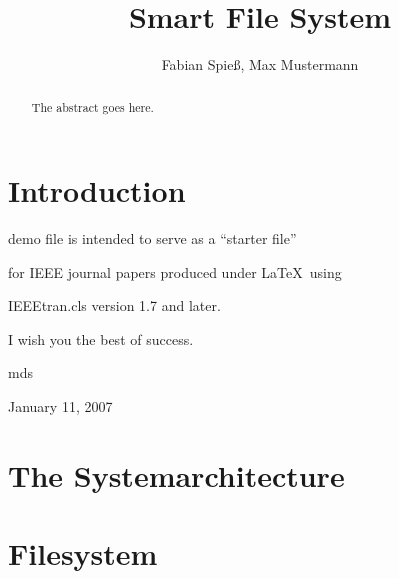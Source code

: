 \documentclass[journal]{IEEEtran}
\begin{document}
\title{Smart File System}



\author{Fabian Spie\ss, Max Mustermann}

        


\maketitle





\begin{abstract}


The abstract goes here.

\end{abstract}



\IEEEpeerreviewmaketitle



\tableofcontents





\section{Introduction}

 demo file is intended to serve as a ``starter file''

for IEEE journal papers produced under \LaTeX\ using

IEEEtran.cls version 1.7 and later.

I wish you the best of success.



\hfill mds

 

\hfill January 11, 2007



\section{The Systemarchitecture}







\section{Filesystem}
\end{document}
